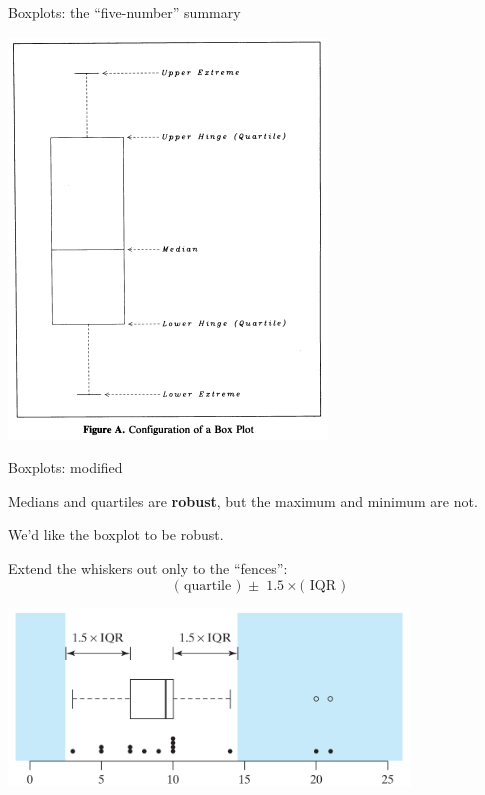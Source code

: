 \begin{frame}{Boxplots: the ``five-number'' summary}

    \begin{center}
        \includegraphics[height=.85\textheight]{boxplot-taxonomy.png}
    \end{center}

\end{frame}


\begin{frame}{Boxplots: modified}

    Medians and quartiles are \textbf{robust},
    but the maximum and minimum are \alert{not}.

    \vspace{2em}

    We'd like the boxplot to be robust. 

    \vspace{2em}

    Extend the whiskers out only to the ``fences'':
    \[
        \text{( quartile )} \; \pm \; 1.5 \times \text{( IQR )} 
    \]

    \centering
    \includegraphics[width=0.8\textwidth]{modified-boxplot-fig_2_4_2.png}

\end{frame}

